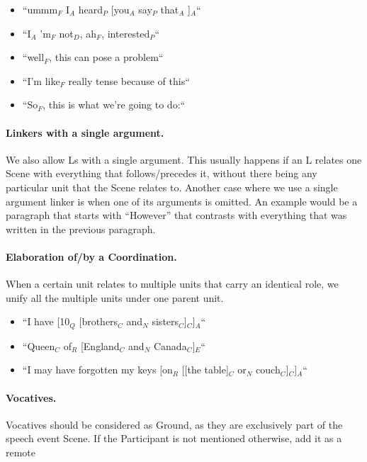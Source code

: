 \documentclass[11pt]{article}
\begin{document}
{\begin{enumerate}
\begin{itemize}
\item 
``ummm$_F$ I$_A$ heard$_P$ [you$_A$ say$_P$ that$_A$ ]$_A$``
\item
``I$_A$ 'm$_F$ not$_D$, ah$_F$, interested$_P$``
\item
``well$_F$, this can pose a problem``
\item
``I'm like$_F$ really tense because of this``
\item
``So$_F$, this is what we're going to do:``
\end{itemize}

\end{enumerate}}


\paragraph{Linkers with a single argument.}
We also allow Ls with a single argument. This usually happens if an L relates one Scene with everything that follows/precedes it, 
without there being any particular unit that the Scene relates to. Another case where we use a single argument linker is when one of its arguments is omitted.
An example would be a paragraph that starts with ``However'' that contrasts with everything that was written in the previous paragraph.

\paragraph {Elaboration of/by a Coordination.} When a certain unit relates to multiple units that carry an identical role, we unify all the multiple units under one parent unit. 

\begin {itemize}
\item
``I have [10$_Q$ [brothers$_C$ and$_N$ sisters$_C$]$_C$]$_A$`` 
\item
``Queen$_C$ of$_R$ [England$_C$ and$_N$ Canada$_C$]$_E$`` 
\item
``I may have forgotten my keys [on$_R$ [[the table]$_C$ or$_N$ couch$_C$]$_C$]$ _A$``
\end{itemize}

\paragraph{Vocatives.} Vocatives should be considered as Ground, as they are exclusively part of the speech event Scene.
If the Participant is not mentioned otherwise, add it as a remote
\end{document}
